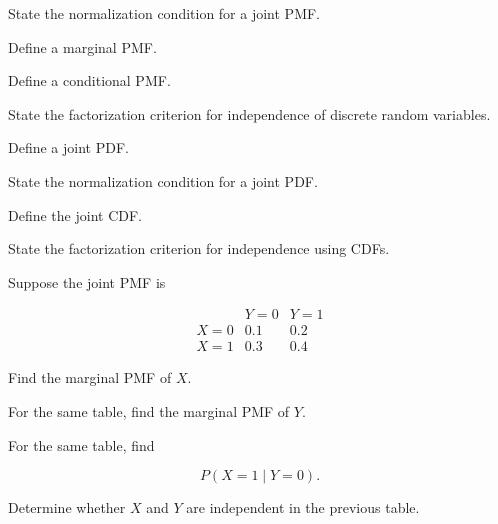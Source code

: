 \begin{exercise}[1]
State the normalization condition for a joint PMF.
\end{exercise}

\begin{exercise}[1]
Define a marginal PMF.
\end{exercise}

\begin{exercise}[1]
Define a conditional PMF.
\end{exercise}

\begin{exercise}[1]
State the factorization criterion for independence of discrete random
variables.
\end{exercise}

\begin{exercise}[1]
Define a joint PDF.
\end{exercise}

\begin{exercise}[1]
State the normalization condition for a joint PDF.
\end{exercise}

\begin{exercise}[1]
Define the joint CDF.
\end{exercise}

\begin{exercise}[1]
State the factorization criterion for independence using CDFs.
\end{exercise}

\begin{exercise}[2]
Suppose the joint PMF is

\[
\begin{array}{c|cc}
 & Y=0 & Y=1\\
\hline
X=0 & 0.1 & 0.2\\
X=1 & 0.3 & 0.4
\end{array}
\]

Find the marginal PMF of \(X\).
\end{exercise}

\begin{exercise}[2]
For the same table, find the marginal PMF of \(Y\).
\end{exercise}

\begin{exercise}[2]
For the same table, find

\[
P(X=1\mid Y=0).
\]
\end{exercise}

\begin{exercise}[2]
Determine whether \(X\) and \(Y\) are independent in the previous
table.
\end{exercise}

